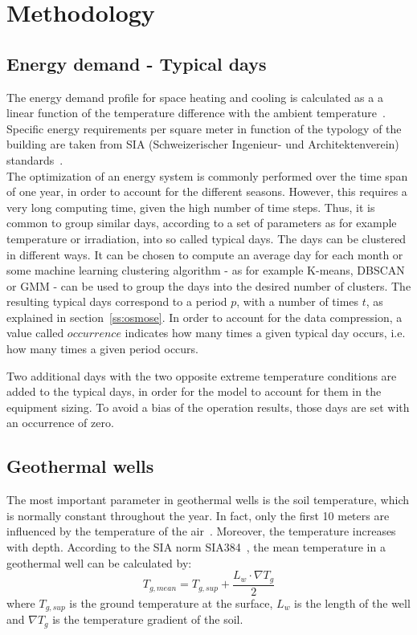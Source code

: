 \documentclass{article}
\begin{document}
\newpage
\section{Methodology}

\subsection{Energy demand - Typical days}\label{ss:typicalDays}
The energy demand profile for space heating and cooling is calculated as a a linear function of the temperature difference with the ambient temperature~\cite{girardinEnerGisGeographicalInformation2010}. Specific energy requirements per square meter in function of the typology of the building are taken from SIA (Schweizerischer Ingenieur- und Architektenverein) standards~\cite{siaSIA38020162016}.\\

The optimization of an energy system is commonly performed over the time span of one year, in order to account for the different seasons. However, this requires a very long computing time, given the high number of time steps. Thus, it is common to group similar days, according to a set of parameters as for example temperature or irradiation, into so called typical days. The days can be clustered in different ways. It can be chosen to compute an average day for each month or some machine learning clustering algorithm - as for example K-means, DBSCAN or GMM - can be used to group the days into the desired number of clusters.
The resulting typical days correspond to a period $p$, with a number of times $t$, as explained in section~\ref{ss:osmose}. In order to account for the data compression, a value called $occurrence$ indicates how many times a given typical day occurs, i.e. how many times a given period occurs.

Two additional days with the two opposite extreme temperature conditions are added to the typical days, in order for the model to account for them in the equipment sizing. To avoid a bias of the operation results, those days are set with an occurrence of zero.


\subsection{Geothermal wells}\label{ss:gtw}

The most important parameter in geothermal wells is the soil temperature, which is normally constant throughout the year. In fact, only the first 10 meters are influenced by the temperature of the air~\cite{hanSensitivityAnalysisVertical2016}. Moreover, the temperature increases with depth. According to the SIA norm SIA384~\cite{siaSIA384Sondes2010}, the mean temperature in a geothermal well can be calculated by:
\begin{equation}
T_{g, mean} = T_{g,sup} + \frac{L_{w} \cdot \nabla T_{g}}{2}
\end{equation}
where $T_{g,sup}$ is the ground temperature at the surface, $L_{w}$ is the length of the well and $ \nabla T_{g}$ is the temperature gradient of the soil. 
\end{document}
